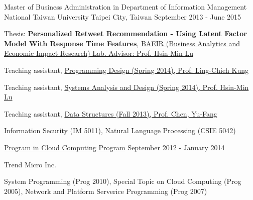 

\begin{cventries}

  \cventry
    {Master of Business Administration in Department of Information Management} %
    {National Taiwan University} %
    {Taipei City, Taiwan} %
    {September 2013 - June 2015} %
    {
      \begin{cvitems} %
        \item {Thesis: \textbf{Personalized Retweet Recommendation - Using Latent Factor Model With Response Time Features}, \href{http://im.ntu.edu.tw/~lu/research_dir.htm}{BAEIR (Business Analytics and Economic Impact Research) Lab. Advisor: Prof. Hsin-Min Lu}}
        \item {Teaching assistant, \href{http://www.im.ntu.edu.tw/~lckung/courses/old/PD14/}{Programming Design (Spring 2014), Prof. Ling-Chieh Kung}}
        \item {Teaching assistant, \href{https://nol.ntu.edu.tw/nol/coursesearch/print_table.php?course_id=705\%2031200&class=&dpt_code=7050&ser_no=63330&semester=102-2&lang=CH}{Systems Analysis and Design (Spring 2014), Prof. Hsin-Min Lu}}
        \item {Teaching assistant, \href{https://nol.ntu.edu.tw/nol/coursesearch/print_table.php?course_id=705\%2021200&class=&dpt_code=7050&ser_no=71181&semester=102-1&lang=CH}{Data Structures (Fall 2013), Prof. Chen, Yu-Fang}}
        \item {Information Security (IM 5011), Natural Language Processing (CSIE 5042)}
      \end{cvitems}
    }

  \cventry
    {\href{https://www.csie.ntu.edu.tw/cloud/}{Program in Cloud Computing Program}} %
    {} %
    {} %
    {September 2012 - January 2014} %
    {
      \begin{cvitems} %
        \item {Trend Micro Inc.}
        \item {System Programming (Prog 2010), Special Topic on Cloud Computing (Prog 2005), Network and Platform Serverice Programming (Prog 2007)}
      \end{cvitems}
    }


\end{cventries}

